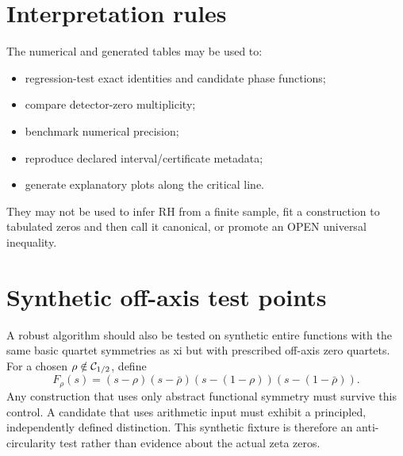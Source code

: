 \section{Interpretation rules}
The numerical and generated tables may be used to:
\begin{itemize}
  \item regression-test exact identities and candidate phase functions;
  \item compare detector-zero multiplicity;
  \item benchmark numerical precision;
  \item reproduce declared interval/certificate metadata;
  \item generate explanatory plots along the critical line.
\end{itemize}
They may not be used to infer RH from a finite sample, fit a construction to tabulated zeros and then call it canonical, or promote an OPEN universal inequality.

\section{Synthetic off-axis test points}
A robust algorithm should also be tested on synthetic entire functions with the same basic quartet symmetries as xi but with prescribed off-axis zero quartets. For a chosen $\rho\notin\mathcal{C}_{1/2}$, define
\[
F_\rho(s)=(s-\rho)(s-\bar\rho)(s-(1-\rho))(s-(1-\bar\rho)).
\]
Any construction that uses only abstract functional symmetry must survive this control. A candidate that uses arithmetic input must exhibit a principled, independently defined distinction. This synthetic fixture is therefore an anti-circularity test rather than evidence about the actual zeta zeros.
